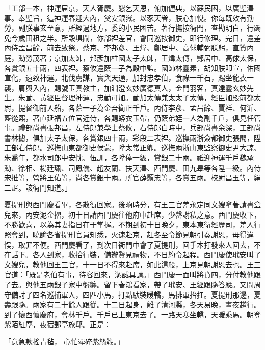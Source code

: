 \begin{showcontents}{}
「工部一本，神運屇京，天人胥慶。懇乞天恩，俯加偓典，以蘇民困，以廣聖澤事。奉聖旨，這神運春迎大內，奠安銀嶽。以豕天眷，朕心加悅。你每既效有勤勞，副朕事玄至意，所經過地方，委的小民困苦。著行撫按衙門，查勘明白，行蠲免今歲田租之半。所毀埧閘，你部裡差官，會同巡按御史，即行修理。完日，還差內侍孟昌齡，前去致祭。蔡京、李邦彥、王煒、鄭居中、高俅輔弼朕躬，直贊內庭，勳勞茂著；京加太師，邦彥加柱國太子太師，王煒太傳，鄭居中、高俅太保，各賞銀五十兩，四表裡。蔡攸還蔭一子為殿中監。國師林靈素，胡知朕叩宣，佑國宣化，遠致神運。北伐虜謀，實與天通，加封忠孝伯，食祿一千石，賜坐龍衣一襲，肩輿入內，賜號玉真教主，加淵澄玄妙廣德真人，金門羽客，真達靈玄妙先生。朱勔、黃經臣督理神運，忠勤可加。勔加太傳兼太太子太傳，經臣加殿前都太尉，提督御前人船，各蔭一子為金吾衛正千戶。內侍李彥、孟昌齡、賈祥、何沂、藍從熙，著直延福五位官近侍，各賜蟒衣玉帶，仍蔭弟姪一人為副千戶，俱見任管事。禮部尚書張邦昌，左侍郎兼學士蔡攸，右侍郎白時中，兵部尚書余深，工部尚書林攄，俱加太子太保，各賞銀四十兩，彩段二表裡。巡撫兩浙僉都御史張閣，陞工部右侍郎。巡撫山東都御史侯蒙，陞太常正卿。巡撫兩浙山東監察御史尹大諒、朱喬年，都水司郎中安忱、伍訓，各陞俸一級，賞銀二十兩。祇迎神運千戶魏承勳、徐相、楊廷珮、司鳳儀、趙友蘭、扶天澤、西門慶、田九皋等各陞一級。內侍宋推等，營將王佑等，尚各賞銀十兩。所官薛顥忠等，各賞五兩。校尉昌玉等，絹二疋。該衙門知道。」

夏提刑與西門慶看畢，各散衙回家。後晌時分，有王三官差永定同文嫂拿著請書盒兒來，內安泥金摺，初十日請西門慶往他府中赴席，少罄謝私之意。西門慶收下，不勝歡喜，以為其妻指日在于掌握。不期到初十日晚夕，東本東衛經歷司，差人行照會到，曉諭各省提刑官員知悉，火速赴京，赶冬至令節見朝引奏謝恩，毋得違悮，取罪不便。西門慶看了，到次日衙門中會了夏提刑，回手本打發來人回去，不在話下。各人到家，收拾行裝，備辦贄見禮物，不日約令起程。西門慶使玳安叫了文嫂兒，教他回王三官，十一日不得來赴席，如此這般，上京見朝謝恩去也。王三官道：「既是老伯有事，待容回來，潔誠具請。」西門慶一面叫將賁四，分付教他跟了去。與他五兩銀子家中盤纏。留下春鴻看家，帶了玳安、王經跟隨答應。又問周守備討了四名巡捕軍人，四匹小馬，打點馱裝暖轎，馬排軍抬扛。夏提刑那邊，夏壽跟隨。兩家有二十餘人跟從。十二日起身，離了清河縣，冬天易晚，晝夜趲行。到了懷西懷慶府，會林千戶。千戶已上東京去了。一路天寒坐轎，天暖乘馬。朝登紫陌紅塵，夜宿郵亭旅邸。正是：

「意急款搖青毡，  心忙斝碎紫絲鞭。」


\end{showcontents}
